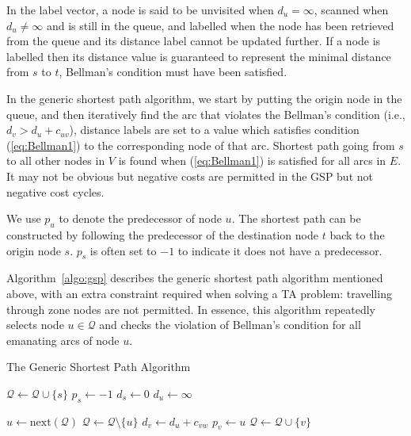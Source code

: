In the label vector,
a node is said to be unvisited when $d_u = \infty$,
scanned when $d_u \neq \infty$ and is still in the queue,
and labelled when the node has been retrieved from the queue and its distance label cannot be updated further.
If a node is labelled then its distance value is guaranteed to represent the minimal distance from $s$ to $t$, Bellman's condition must have been satisfied.

In the generic shortest path algorithm,
we start by putting the origin node in the queue,
and then iteratively find the arc that violates the Bellman's condition (i.e., $d_v > d_u + c_{uv}$),
distance labels are set to a value which satisfies condition (\ref{eq:Bellman1}) to the corresponding node of that arc.
Shortest path going from $s$ to all other nodes in $V$ is found when (\ref{eq:Bellman1}) is satisfied for all arcs in $E$.
It may not be obvious but negative costs are permitted in the GSP but not negative cost cycles.

We use $p_u$ to denote the predecessor of node $u$.
The shortest path can be constructed by following the predecessor of the destination node $t$ back to the origin node $s$. $p_s$ is often set to $-1$ to indicate it does not have a predecessor.


Algorithm~\ref{algo:gsp} \citep{Klunder} describes the generic shortest path algorithm mentioned above,
with an extra constraint required when solving a TA problem: travelling through zone nodes are not permitted.
In essence, this algorithm repeatedly selects node $u\in\mathcal{Q}$ and checks the violation of Bellman's condition for all emanating arcs of node $u$.
\begin{algorithm}
    \caption{The Generic Shortest Path Algorithm}
    \label{algo:gsp}
    \begin{algorithmic}[1]
        \State $\mathcal{Q} \gets \mathcal{Q} \cup \{s\}$ 
        \State $p_s \gets -1$ 
        \State $d_s \gets 0$
         
        \State $d_u \gets \infty$
    \EndFor

    \State $ u \gets \text{next}(\mathcal{Q}) $ 
    \State $ \mathcal{Q} \gets \mathcal{Q} \setminus \{u\} $
     
    \State $d_v \gets d_u + c_{vw}$
    \State $p_v \gets u$
    \State $\mathcal{Q} \gets \mathcal{Q} \cup \{v\}$ 
\EndIf
                    \EndIf
                \EndFor
            \EndIf
        \EndWhile
    \EndProcedure
\end{algorithmic}
\end{algorithm}

